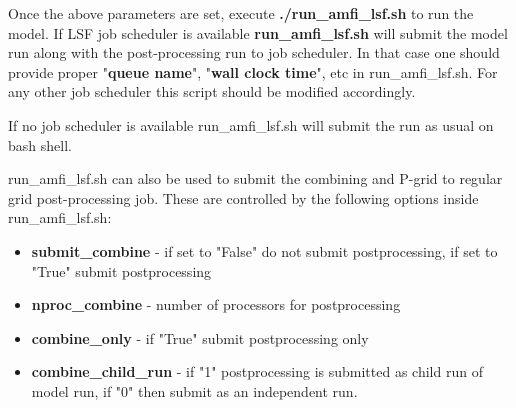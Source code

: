 \documentclass{article}
\begin{document}
Once the above parameters are set, execute \textbf{./run\_amfi\_lsf.sh} to run the model. 
If LSF job scheduler is available \textbf{run\_amfi\_lsf.sh} will submit the model run along with the post-processing run to job scheduler. In that case one should provide proper "\textbf{queue name}", "\textbf{wall clock time}", etc in run\_amfi\_lsf.sh. For any other job scheduler this script should be modified accordingly.

If no job scheduler is available run\_amfi\_lsf.sh will submit the run as usual on bash shell.

run\_amfi\_lsf.sh can also be used to submit the combining and P-grid to regular grid post-processing job. These are controlled by the following options inside run\_amfi\_lsf.sh:
\begin{itemize}
	\item \textbf{submit\_combine} - if set to "False" do not submit postprocessing, if set to "True" submit postprocessing
	\item \textbf{nproc\_combine} - number of processors for postprocessing 
	\item \textbf{combine\_only} - if "True" submit postprocessing only
	\item \textbf{combine\_child\_run} - if "1" postprocessing is submitted as child run of model run, if "0" then submit as an independent run.
\end{itemize}
\end{document}
